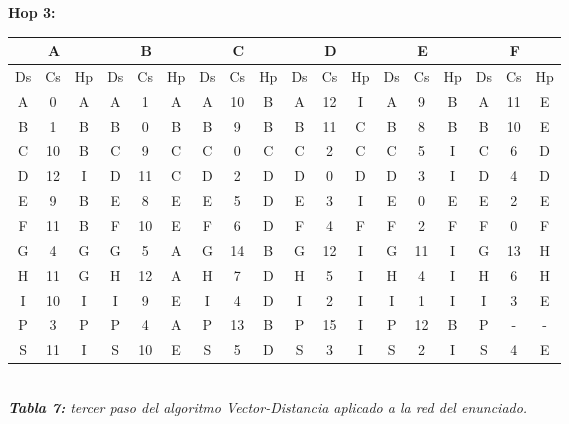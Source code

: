 \documentclass[letterpaper,10pt,onecolumn,titlepage]{article}
\begin{document}
\newpage 
 
 \textbf{Hop 3:}
 
 \begin{center}
   \begin{tabular}{|c|c|c|c|c|c|c|c|c|c|c|c|c|c|c|c|c|c|} \hline
    \multicolumn{3}{|c|}{A} & \multicolumn{3}{|c|}{B} & \multicolumn{3}{|c|}{C} & \multicolumn{3}{|c|}{D} & \multicolumn{3}{|c|}{E} & \multicolumn{3}{|c|}{F} \\ \hline
     Ds & Cs & Hp & Ds & Cs & Hp & Ds & Cs & Hp & Ds & Cs & Hp & Ds & Cs & Hp & Ds & Cs & Hp \\ \hline
     A  & 0  & A  & A  & 1  & A  & A  & 10  & B  & A  & 12  & I  & A  & 9  & B  & A  & \color{red}11  & \color{red}E \\ \hline
     B  & 1  & B  & B  & 0  & B  & B  & 9  & B  & B  & 11  & C  & B  & 8  & B & B  & 10  & E \\ \hline
     C  & 10  & B  & C  & 9  & C  & C  & 0  & C  & C  & 2  & C  & C  & \color{red}5  & \color{red}I  & C  & 6  & D \\ \hline
     D  & 12  & I  & D  & 11  & C & D  & 2  & D  & D  & 0  & D  & D  & 3  & I  & D  & 4  & D \\ \hline
     E  & 9  & B  & E  & 8  & E  & E  & \color{red}5  & \color{red}D  & E  & 3  & I  & E  & 0  & E  & E  & 2  & E \\ \hline
     F  & \color{red}11  &\color{red} B  & F  & 10  & E  & F  & 6  & D  & F  & 4  & F  & F  & 2  & F  & F  & 0  & F \\ \hline
     G  & 4  & G  & G  & 5  & A  & G  & \color{red}14  & \color{red}B  & G  & \color{red}12  & \color{red}I  & G  & \color{red}11  &\color{red} I  & G  & 13  & H \\ \hline
     H  & 11  & G  & H  & \color{red}12  & \color{red}A  & H  & \color{red}7  & \color{red}D  & H  & 5  & I  & H  & 4  & I  & H  & 6  & H \\ \hline
     I  & 10  & I  & I  & 9  & E  & I  & 4  & D  & I  & 2  & I  & I  & 1  & I  & I  & 3  & E \\ \hline
     P  & 3  & P  & P  & 4  & A  & P  & \color{red}13  & \color{red}B  & P  & \color{red}15  & \color{red}I  & P  & \color{red}12  & \color{red}B  & P  & -  & - \\ \hline
     S  & 11  & I  & S  & \color{red}10  &\color{red} E  & S  & \color{red}5  & \color{red}D  & S  & 3  & I  & S  & 2  & I  & S  & \color{red}4  & \color{red}E \\ \hline
   \end{tabular}\\
   \textit{\textbf{Tabla 7:} tercer paso del algoritmo Vector-Distancia aplicado a la red del enunciado.}
 \end{center}
 
\end{document}
